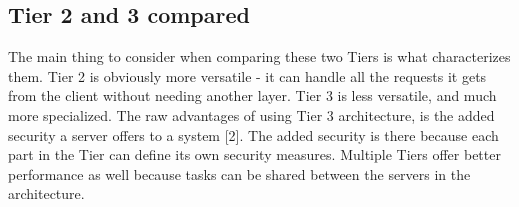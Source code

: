 \subsection{Tier 2 and 3 compared}

The main thing to consider when comparing these two Tiers is what characterizes them. Tier 2 
is obviously more versatile - it can handle all the requests it gets from the client without 
needing another layer\cite{tierserverclient08}. Tier 3 is less versatile, and much more 
specialized. The raw advantages of using Tier 3 architecture, is the added security a server 
offers to a system [2]. The added security is there because each part in the Tier can define 
its own security measures\cite{tierserverclient08}. Multiple Tiers offer better performance 
as well because tasks can be shared between the servers in the 
architecture\cite{tierserverclient08}.